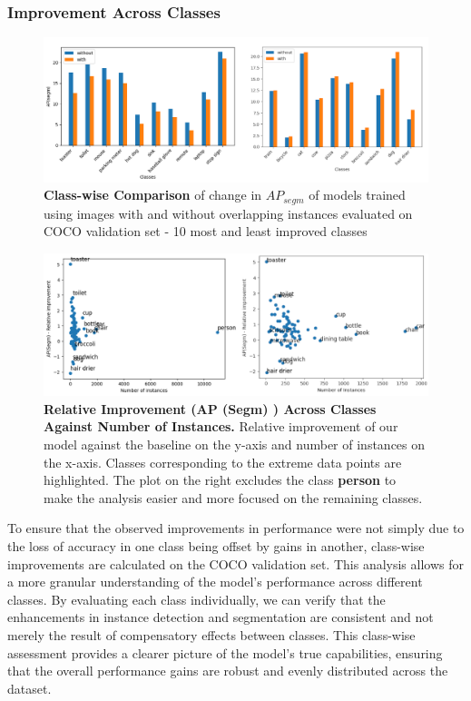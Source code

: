 \subsubsection{Improvement Across Classes}
\begin{figure}
	\centering
	\includegraphics[width=1.05\textwidth]{Images/main/overlap_classes_new.png}
	\caption[\textbf{Training Without Overlapping Instances - Class-wise Comparison}]{\textbf{Class-wise Comparison} of change in \(AP_{segm}\) of models trained using images with and without overlapping instances evaluated on COCO validation set - 10 most and least improved classes}
	\label{fig:overlap_classes}
\end{figure}

\begin{figure}
	\centering
	\includegraphics[width=1\textwidth]{Images/main/relative_improvement_combined.png}
	\caption[\textbf{Relative Improvement Against Number of Instances}]{\textbf{Relative Improvement (AP (Segm) ) Across Classes Against Number of Instances.} Relative improvement of our model against the baseline on the y-axis and number of instances on the x-axis. Classes corresponding to the extreme data points are highlighted. The plot on the right excludes the class \textbf{person} to make the analysis easier and more focused on the remaining classes.}
	\label{fig:relative_improvement}
\end{figure}

To ensure that the observed improvements in performance were not simply due to the loss of accuracy in one class being offset by gains in another, class-wise improvements are calculated on the COCO validation set. This analysis allows for a more granular understanding of the model’s performance across different classes. By evaluating each class individually, we can verify that the enhancements in instance detection and segmentation are consistent and not merely the result of compensatory effects between classes. This class-wise assessment provides a clearer picture of the model's true capabilities, ensuring that the overall performance gains are robust and evenly distributed across the dataset.

